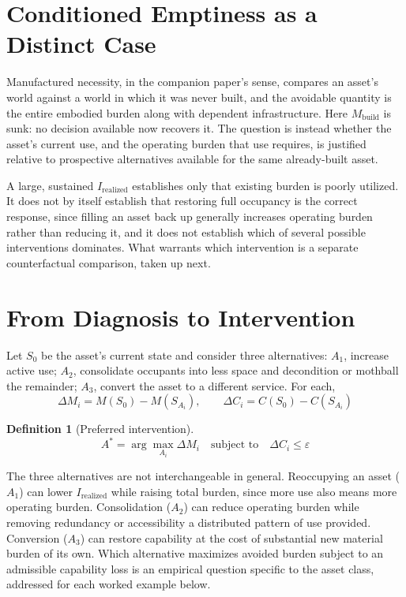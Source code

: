 \documentclass[11pt]{article}
\newtheorem{definition}{Definition}[section]
\begin{document}
\section{Conditioned Emptiness as a Distinct Case}

Manufactured necessity, in the companion paper's sense, compares an asset's world against a world in which it was never built, and the avoidable quantity is the entire embodied burden along with dependent infrastructure. Here $M_{\text{build}}$ is sunk: no decision available now recovers it. The question is instead whether the asset's current use, and the operating burden that use requires, is justified relative to prospective alternatives available for the same already-built asset.

A large, sustained $I_{\text{realized}}$ establishes only that existing burden is poorly utilized. It does not by itself establish that restoring full occupancy is the correct response, since filling an asset back up generally increases operating burden rather than reducing it, and it does not establish which of several possible interventions dominates. What warrants which intervention is a separate counterfactual comparison, taken up next.

\section{From Diagnosis to Intervention}

Let $S_0$ be the asset's current state and consider three alternatives: $A_1$, increase active use; $A_2$, consolidate occupants into less space and decondition or mothball the remainder; $A_3$, convert the asset to a different service. For each,
\[
\Delta M_i = M(S_0) - M(S_{A_i}), \qquad \Delta C_i = C(S_0) - C(S_{A_i})
\]

\begin{definition}[Preferred intervention]
\[
A^{*} = \arg\max_{A_i} \Delta M_i \quad \text{subject to} \quad \Delta C_i \leq \varepsilon
\]
\end{definition}

The three alternatives are not interchangeable in general. Reoccupying an asset ($A_1$) can lower $I_{\text{realized}}$ while raising total burden, since more use also means more operating burden. Consolidation ($A_2$) can reduce operating burden while removing redundancy or accessibility a distributed pattern of use provided. Conversion ($A_3$) can restore capability at the cost of substantial new material burden of its own. Which alternative maximizes avoided burden subject to an admissible capability loss is an empirical question specific to the asset class, addressed for each worked example below.
\end{document}
